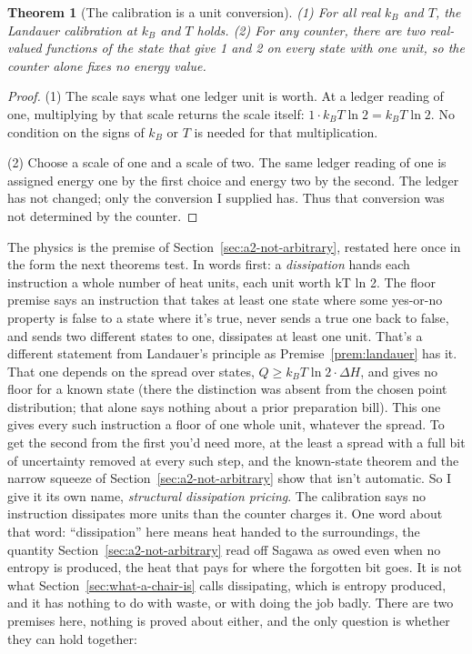 \documentclass[11pt,twoside]{article}
\theoremstyle{thielethm}
\newtheorem{theorem}{Theorem}[section]
\theoremstyle{thieledef}
\theoremstyle{thieledef}
\theoremstyle{thieledef}
\theoremstyle{thielethm}
\theoremstyle{thieleobs}
\theoremstyle{thielethm}
\begin{document}
\begin{theorem}[The calibration is a unit conversion]\label{thm:u24-calibration}
(1) For all real $k_B$ and $T$, the Landauer calibration at $k_B$ and $T$ holds. (2) For any counter, there are two real-valued functions of
the state that give 1 and 2 on every state with
one unit, so the counter alone fixes no energy value.
\end{theorem}

\begin{proof}
(1) The scale says what one ledger unit is worth. At a ledger reading of
one, multiplying by that scale returns the scale itself:
$1\cdot k_B T\ln2=k_B T\ln2$. No condition on the signs of $k_B$ or $T$
is needed for that multiplication.

(2) Choose a scale of one and a scale of two. The same ledger reading of
one is assigned energy one by the first choice and energy two by the
second. The ledger has not changed; only the conversion I supplied has.
Thus that conversion was not determined by the counter.
\end{proof}

The physics is the premise of
Section~\ref{sec:a2-not-arbitrary}, restated here once in the form the next theorems test. In words first: a \emph{dissipation}
hands each instruction a whole number of heat units, each unit worth kT ln 2. The floor premise
says an instruction that takes at least one state where some yes-or-no
property is false to a state where it's true, never sends a true one back to false, and sends
two different states to one, dissipates at least one unit. That's a different statement from Landauer's principle as
Premise~\ref{prem:landauer} has it. That one depends on the spread over states,
$Q \ge k_B T \ln 2 \cdot \Delta H$, and gives no floor for a known state (there the distinction was
absent from the chosen point distribution; that alone says nothing
about a prior preparation bill). This one gives every such
instruction a floor of one whole unit, whatever the spread. To get the second from the first
you'd need more, at the least a spread with a full bit of uncertainty removed at every such
step, and the known-state theorem and the narrow squeeze of Section~\ref{sec:a2-not-arbitrary}
show that isn't automatic. So I give it its own name, \emph{structural dissipation pricing}. The calibration says no instruction dissipates more units than the counter charges
it. One word about that word: ``dissipation'' here means heat handed to the surroundings, the
quantity Section~\ref{sec:a2-not-arbitrary} read off Sagawa as owed even when no entropy is
produced, the heat that pays for where the forgotten bit goes. It is not what Section~\ref{sec:what-a-chair-is}
calls dissipating, which is entropy produced, and it has nothing to do with waste, or with doing
the job badly. There are two premises here, nothing is proved about either,
and the only question is whether they can hold together:
\end{document}
